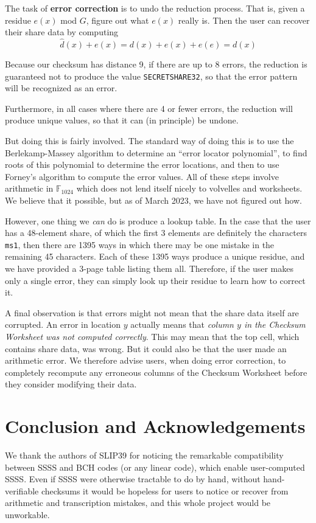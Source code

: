 \documentclass[letterpaper]{article}
\newcommand{\ftttwo}{\mathbb{F}_{1024}}
\newcommand{\vc}[1]{\texttt{#1}} %
\begin{document}
The task of \textbf{error correction} is to undo the reduction process. That is,
given a residue $e(x)$ mod $G$, figure out what $e(x)$ really is. Then the user
can recover their share data by computing
\[ \hat{d}(x) + e(x) = d(x) + e(x) + e(e) = d(x) \]

Because our checksum has distance 9, if there are up to 8 errors, the reduction
is guaranteed not to produce the value \vc{SECRETSHARE32}, so that the error
pattern will be recognized as an error.

Furthermore, in all cases where there are 4 or fewer errors, the reduction will
produce unique values, so that it can (in principle) be undone.

But doing this is fairly involved. The standard way of doing this is to use the
Berlekamp-Massey algorithm to determine an ``error locator polynomial'', to
find roots of this polynomial to determine the error locations, and then to use
Forney's algorithm to compute the error values. All of these steps involve
arithmetic in $\ftttwo$ which does not lend itself nicely to volvelles and
worksheets. We believe that it possible, but as of March 2023, we have not
figured out how.

However, one thing we \emph{can} do is produce a lookup table. In the case that
the user has a 48-element share, of which the first 3 elements are definitely
the characters \vc{ms1}, then there are 1395 ways in which there may be one
mistake in the remaining 45 characters. Each of these 1395 ways produce a unique
residue, and we have provided a 3-page table listing them all. Therefore, if
the user makes only a single error, they can simply look up their residue to
learn how to correct it.

A final observation is that errors might not mean that the share data itself are
corrupted. An error in location $y$ actually means that \emph{column $y$ in the
Checksum Worksheet was not computed correctly}. This may mean that the top cell,
which contains share data, was wrong. But it could also be that the user made an
arithmetic error. We therefore advise users, when doing error correction, to
completely recompute any erroneous columns of the Checksum Worksheet before they
consider modifying their data.

\section{Conclusion and Acknowledgements}

We thank the authors of SLIP39 for noticing the remarkable compatibility between
SSSS and BCH codes (or any linear code), which enable user-computed SSSS. Even if
SSSS were otherwise tractable to do by hand, without hand-verifiable checksums it
would be hopeless for users to notice or recover from arithmetic and transcription
mistakes, and this whole project would be unworkable.
\end{document}
